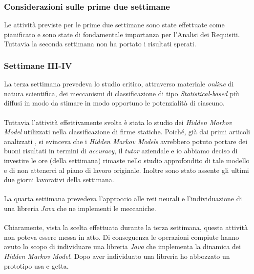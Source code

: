 \subsubsection*{Considerazioni sulle prime due settimane}
\label{3.1.1.1}
Le attività previste per le prime due settimane sono state effettuate come pianificato e sono state di fondamentale importanza per l'Analisi dei Requisiti. Tuttavia la seconda settimana non ha portato i risultati sperati.
\subsubsection{Settimane III-IV}
\label{3.1.2}
La terza settimana prevedeva lo studio critico, attraverso materiale \emph{online} di natura scientifica, dei meccanismi di classificazione di tipo \emph{Statistical-based} più diffusi in modo da stimare in modo opportuno le potenzialità di ciascuno.\\\\
Tuttavia l'attività effettivamente svolta è stata lo studio dei \emph{Hidden Markov Model} utilizzati nella classificazione di firme statiche. Poiché, già dai primi articoli analizzati \cite{3}\cite{5}\cite{6}, si evinceva che i \emph{Hidden Markov Models} avrebbero potuto portare dei buoni risultati in termini di \emph{accuracy}, il \emph{tutor} aziendale e io abbiamo deciso di investire le ore (della settimana) rimaste nello studio approfondito di tale modello e di non attenerci al piano di lavoro originale. Inoltre sono stato assente gli ultimi due giorni lavorativi della settimana.\\\\
La quarta settimana prevedeva l'approccio alle reti neurali e l'individuazione di una libreria \emph{Java} che ne implementi le meccaniche.\\\\Chiaramente, vista la scelta effettuata durante la terza settimana, questa attività non poteva essere messa in atto. Di conseguenza le operazioni compiute hanno avuto lo scopo di individuare una libreria \emph{Java} che implementa la dinamica dei \emph{Hidden Markov Model}. Dopo aver individuato una libreria ho abbozzato un prototipo usa e getta.
